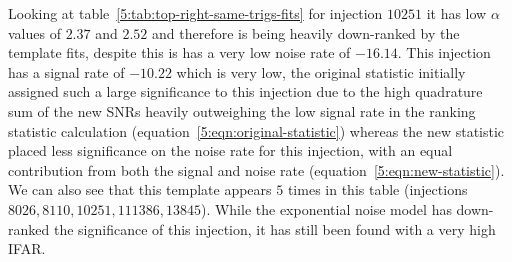 Looking at table~\ref{5:tab:top-right-same-trigs-fits} for injection $10251$ it has low $\alpha$ values of $2.37$ and $2.52$ and therefore is being heavily down-ranked by the template fits, despite this is has a very low noise rate of $-16.14$. This injection has a signal rate of $-10.22$ which is very low, the original statistic initially assigned such a large significance to this injection due to the high quadrature sum of the new SNRs heavily outweighing the low signal rate in the ranking statistic calculation (equation~\ref{5:eqn:original-statistic}) whereas the new statistic placed less significance on the noise rate for this injection, with an equal contribution from both the signal and noise rate (equation~\ref{5:eqn:new-statistic}). We can also see that this template appears $5$ times in this table (injections $8026, 8110, 10251, 111386, 13845$). While the exponential noise model has down-ranked the significance of this injection, it has still been found with a very high IFAR.

